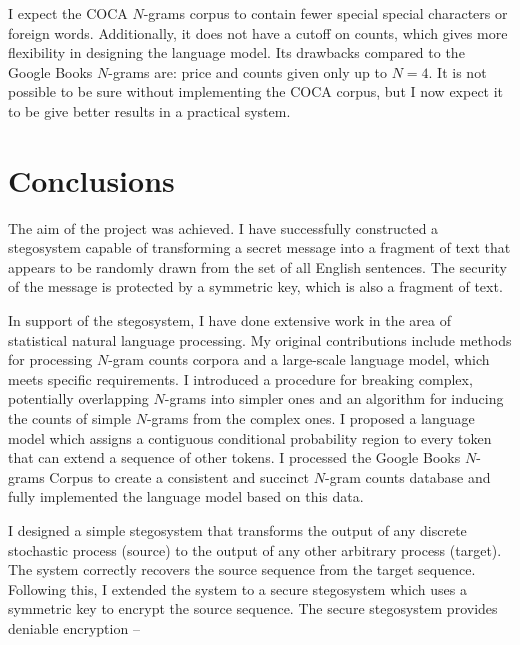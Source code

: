 \documentclass[draft]{IIBproject}
\begin{document}
I expect the COCA $N$-grams corpus to contain fewer special special characters or foreign words. Additionally, it does not have a cutoff on counts, which gives more flexibility in designing the language model. Its drawbacks compared to the Google Books $N$-grams are: price and counts given only up to $N=4$. It is not possible to be sure without implementing the COCA corpus, but I now expect it to be give better results in a practical system.

\cleardoublepage
\section{Conclusions}

The aim of the project was achieved. I have successfully constructed a stegosystem capable of transforming a secret message into a fragment of text that appears to be randomly drawn from the set of all English sentences. The security of the message is protected by a symmetric key, which is also a fragment of text.

In support of the stegosystem, I have done extensive work in the area of statistical natural language processing. My original contributions include methods for processing $N$-gram counts corpora and a large-scale language model, which meets specific requirements. I introduced a procedure for breaking complex, potentially overlapping $N$-grams into simpler ones and an algorithm for inducing the counts of simple $N$-grams from the complex ones. I proposed a language model which assigns a contiguous conditional probability region to every token that can extend a sequence of other tokens. I processed the Google Books $N$-grams Corpus to create a consistent and succinct $N$-gram counts database and fully implemented the language model based on this data.

I designed a simple stegosystem that transforms the output of any discrete stochastic process (source) to the output of any other arbitrary process (target). The system correctly recovers the source sequence from the target sequence. Following this, I extended the system to a secure stegosystem which uses a symmetric key to encrypt the source sequence. The secure stegosystem provides deniable encryption --
\end{document}
